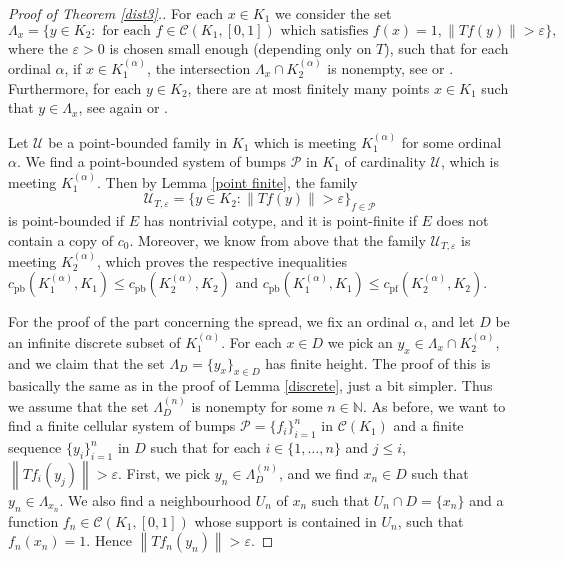 \documentclass{amsart}
\numberwithin{equation}{section}
\theoremstyle{definition}
\def\C{\mathcal C}
\def\ep{\varepsilon}
\def\en{\mathbb N}
\newcommand{\norm}[1]{\left\|#1\right\|}
\begin{document}
\begin{proof}[Proof of Theorem \ref{dist3}.]
For each $x \in K_1$ we consider the set 
\[\Lambda_x=\{y \in K_2: \text{ for each } f \in \C(K_1, [0, 1]) \text{ which satisfies } f(x)=1, \norm{Tf(y)}>\ep\},\]
where the $\ep>0$ is chosen small enough (depending only on $T$), such that for each ordinal $\alpha$, if $x \in K_1^{(\alpha)}$, the intersection $\Lambda_x \cap K_2^{(\alpha)}$ is nonempty, see \cite[Proof of Theorem 1.7]{GalegoVillamizar} or \cite[Lemma 3.1(b)]{rondos-scattered-subspaces}. Furthermore, for each $y \in K_2$, there are at most finitely many points $x \in K_1$ such that $y \in \Lambda_x$, see again \cite[Proof of Theorem 1.7]{GalegoVillamizar} or \cite[Lemma 3.1 (a)]{rondos-scattered-subspaces}.

Let $\mathcal{U}$ be a point-bounded family in $K_1$ which is meeting $K_1^{(\alpha)}$ for some ordinal $\alpha$. We find a point-bounded system of bumps $\mathcal{P}$ in $K_1$ of cardinality $\mathcal{U}$, which is meeting $K_1^{(\alpha)}$.  Then by Lemma \ref{point finite}, the family
\[\mathcal{U}_{T, \ep}=\{y \in K_2: \norm{Tf(y)} > \ep\}_{f \in \mathcal{P}}\]
is point-bounded if $E$ has nontrivial cotype, and it is point-finite if $E$ does not contain a copy of $c_0$. Moreover, we know from above that the family $\mathcal{U}_{T, \ep}$ is meeting $K_2^{(\alpha)}$, which proves the respective inequalities $c_{\text{pb}}(K_1^{(\alpha)}, K_1) \leq c_{\text{pb}}(K_2^{(\alpha)}, K_2)$ and $c_{\text{pb}}(K_1^{(\alpha)}, K_1) \leq c_{\text{pf}}(K_2^{(\alpha)}, K_2)$.

For the proof of the part concerning the spread, we fix an ordinal $\alpha$, and let $D$ be an infinite discrete subset of $K_1^{(\alpha)}$. For each $x \in D$ we pick an $y_x \in \Lambda_x \cap K_2^{(\alpha)}$, and we claim that the set $\Lambda_D=\{y_x\}_{x \in D}$ has finite height. The proof of this is basically the same as in the proof of Lemma \ref{discrete}, just a bit simpler. 
Thus we assume that the set $\Lambda_D^{(n)}$ is nonempty for some $n \in \en$.  As before, we want to find a finite cellular system of bumps $\mathcal{P}=\{f_i\}_{i=1}^{n}$ in $\C(K_1)$ and a finite sequence $\{y_i\}_{i=1}^{n}$ in $D$ such that for each $i \in \{1, \ldots, n\}$ and $j \leq i$, $\norm{Tf_i(y_j)}>\ep$. First, we pick $y_n \in \Lambda_D^{(n)}$, and we find $x_n \in D$ such that $y_n \in \Lambda_{x_n}$. We also find a neighbourhood $U_n$ of $x_n$ such that $U_n \cap D=\{x_n\}$ and a function $f_n \in \C(K_1, [0, 1])$ whose support is contained in $U_n$, such that $f_n(x_n)=1$. Hence $\norm{Tf_n(y_n)}>\ep$.


\end{proof}
\end{document}
